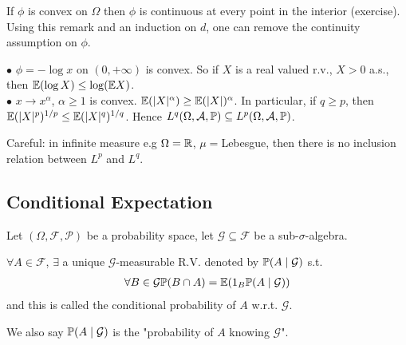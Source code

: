 \documentclass[a4paper]{article}
\begin{document}
\begin{rem}
If $\phi$ is convex on $\Omega$ then $\phi$ is continuous at every point in the interior (exercise).\\
Using this remark and an induction on $d$, one can remove the continuity assumption on $\phi$.
\end{rem}

\begin{eg}
$\bullet$ $\phi = -\log x$ on $(0,+\infty)$ is convex. So if $X$ is a real valued r.v., $X > 0$ a.s., then $\E (\log X) \leq \log (\E X)$.\\
$\bullet$ $x \to x^\alpha$, $\alpha \geq 1$ is convex. $\E(|X|^\alpha) \geq \E(|X|)^\alpha$. In particular, if $q \geq p$, then $\E(|X|^p)^{1/p} \leq \E(|X|^q)^{1/q}$. Hence $L^q (\Omega,\mathcal{A},\P) \subseteq L^p (\Omega,\mathcal{A},\P)$.
\end{eg}

Careful: in infinite measure e.g $\Omega = \R$, $\mu = $Lebesgue, then there is no inclusion relation between $L^p$ and $L^q$.

\subsection{Conditional Expectation}
Let $(\Omega,\mathcal{F},\mathcal{P})$ be a probability space, let $\mathcal{G} \subseteq \mathcal{F}$ be a sub-$\sigma$-algebra.

\begin{prop}
$\forall A \in \mathcal{F}$, $\exists$ a unique $\mathcal{G}$-measurable R.V. denoted by $\P(A \mid \mathcal{G})$ s.t. 
\begin{equation*}
\begin{aligned}
\forall B \in \mathcal{G} \P(B \cap A) = \E(1_B \P(A \mid \mathcal{G}))
\end{aligned}
\end{equation*}
and this is called the conditional probability of $A$ w.r.t. $\mathcal{G}$.

We also say $\P(A \mid \mathcal{G})$ is the "probability of $A$ knowing $\mathcal{G}$".
\end{prop}
\end{document}

